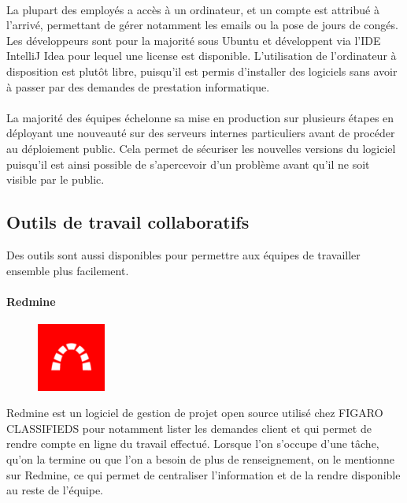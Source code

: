 \paragraph{}
La plupart des employés a accès à un ordinateur, et un compte est attribué à l'arrivé, permettant de gérer notamment les emails ou la pose de jours de congés.
Les développeurs sont pour la majorité sous Ubuntu et développent via l'IDE IntelliJ Idea pour lequel une license est disponible.
L'utilisation de l'ordinateur à disposition est plutôt libre, puisqu'il est permis d'installer des logiciels sans avoir à passer par des demandes de prestation informatique.
\paragraph{}
La majorité des équipes échelonne sa mise en production sur plusieurs étapes en déployant une nouveauté sur des serveurs internes particuliers avant de procéder au déploiement public.
Cela permet de sécuriser les nouvelles versions du logiciel puisqu'il est ainsi possible de s'apercevoir d'un problème avant qu'il ne soit visible par le public.

\subsection{Outils de travail collaboratifs}
\label{subs:Outils de travail collaboratifs}
Des outils sont aussi disponibles pour permettre aux équipes de travailler ensemble plus facilement.
\paragraph{Redmine}
\label{par:Redmine}
\begin{figure}
  \begin{center}
    \includegraphics[width=0.20\textwidth]{Pictures/redmine_logo.png}
  \end{center}
\end{figure}
Redmine est un logiciel de gestion de projet open source utilisé chez FIGARO CLASSIFIEDS pour notamment lister les demandes client et qui permet de rendre compte en ligne du travail effectué.
Lorsque l'on s'occupe d'une tâche, qu'on la termine ou que l'on a besoin de plus de renseignement, on le mentionne sur Redmine, ce qui permet de centraliser l'information et de la rendre disponible au reste de l'équipe.
